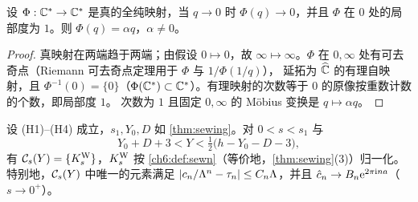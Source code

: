 \begin{lemma}\label{ch6:lem:proper}
设 $\Phi:\mathbb{C}^*\to\mathbb{C}^*$ 是真的全纯映射，当 $q\to0$ 时 $\Phi(q)\to0$，并且 $\Phi$ 在 $0$ 处的局部度为 $1$。则 $\Phi(q)=\alpha q$，$\alpha\ne0$。
\end{lemma}

\begin{proof}
真映射在两端趋于两端；由假设 $0\mapsto0$，故 $\infty\mapsto\infty$。$\Phi$ 在 $0,\infty$ 处有可去奇点（Riemann 可去奇点定理用于 $\Phi$ 与 $1/\Phi(1/q)$），
延拓为 $\widehat{\mathbb{C}}$ 的有理自映射，且 $\Phi^{-1}(0)=\{0\}$（$\Phi(\mathbb{C}^*)\subset\mathbb{C}^*$）。有理映射的次数等于 $0$ 的原像按重数计数的个数，即局部度 $1$。
次数为 $1$ 且固定 $0,\infty$ 的 Möbius 变换是 $q\mapsto\alpha q$。
\end{proof}

\begin{theorem}[刻画]\label{thm:characterization}
设 \textup{(H1)--(H4)} 成立，$s_1,Y_0,D$ 如 \cref{thm:sewing}。对 $0<s<s_1$ 与
\[
 Y_0+D+3<Y<\tfrac12\bigl(h-Y_0-D-3\bigr),
\]
有 $\mathcal C_s(Y)=\{K^{\mathrm W}_s\}$，$K^{\mathrm W}_s$ 按 \cref{ch6:def:sewn}（等价地，\cref{thm:sewing}(3)）归一化。特别地，$\mathcal C_s(Y)$ 中唯一的元素满足
$|c_n/\Lambda^n-\tau_n|\le C_n\Lambda$，并且 $\hat c_n\to B_n\mathrm{e}^{2\pi\mathrm{i} na}$（$s\to0^+$）。
\end{theorem}

